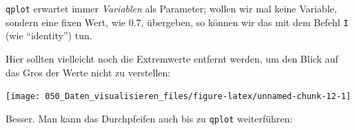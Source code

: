 \documentclass[12pt,ngerman,]{book}
\makeatletter
\newenvironment{Shaded}{\begin{snugshade}}{\end{snugshade}}
\newcommand{\KeywordTok}[1]{\textcolor[rgb]{0.13,0.29,0.53}{\textbf{#1}}}
\newcommand{\DataTypeTok}[1]{\textcolor[rgb]{0.13,0.29,0.53}{#1}}
\newcommand{\DecValTok}[1]{\textcolor[rgb]{0.00,0.00,0.81}{#1}}
\newcommand{\FloatTok}[1]{\textcolor[rgb]{0.00,0.00,0.81}{#1}}
\newcommand{\StringTok}[1]{\textcolor[rgb]{0.31,0.60,0.02}{#1}}
\newcommand{\OperatorTok}[1]{\textcolor[rgb]{0.81,0.36,0.00}{\textbf{#1}}}
\newcommand{\NormalTok}[1]{#1}
\newenvironment{kframe}{%
\medskip{}
\setlength{\fboxsep}{.8em}
 \def\at@end@of@kframe{}%
 \ifinner\ifhmode%
  \def\at@end@of@kframe{\end{minipage}}%
  \begin{minipage}{\columnwidth}%
 \fi\fi%
 \def\FrameCommand##1{\hskip\@totalleftmargin \hskip-\fboxsep
 \colorbox{shadecolor}{##1}\hskip-\fboxsep
     \hskip-\linewidth \hskip-\@totalleftmargin \hskip\columnwidth}%
 \MakeFramed {\advance\hsize-\width
   \@totalleftmargin\z@ \linewidth\hsize
   \@setminipage}}%
 {\par\unskip\endMakeFramed%
 \at@end@of@kframe}
\renewenvironment{Shaded}{\begin{kframe}}{\end{kframe}}
\theoremstyle{definition}
\theoremstyle{definition}
\theoremstyle{remark}
\makeatother
\begin{document}
\texttt{qplot} erwartet immer \emph{Variablen} als Parameter; wollen wir
mal keine Variable, sondern eine fixen Wert, wie 0.7, übergeben, so
können wir das mit dem Befehl \texttt{I} (wie ``identity'') tun.

Hier sollten vielleicht noch die Extremwerte entfernt werden, um den
Blick auf das Gros der Werte nicht zu verstellen:

\begin{Shaded}
\end{Shaded}

\begin{center}\texttt{[image: 050\_Daten\_visualisieren\_files/figure-latex/unnamed-chunk-12-1]} \end{center}

Besser. Man kann das Durchpfeifen auch bis zu \texttt{qplot}
weiterführen:

\begin{Shaded}
\end{Shaded}
\end{document}
